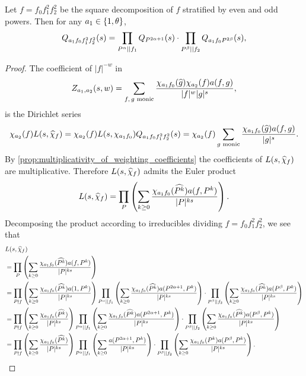 \documentclass[12pt,reqno,oneside]{amsart}
\begin{document}
    \begin{theorem}\label{thm:correction_polynomial_Euler_product}
        Let $f = f_{0}f_{1}^{2}f_{2}^{2}$ be the square decomposition of $f$ stratified by even and odd powers. Then for any $a_{1} \in \{1,\theta\}$,
        \[
            Q_{a_{1}f_{0}f_{1}^{2}f_{2}^{2}}(s) = \prod_{P^{\alpha} \mid\mid f_{1}}Q_{P^{2\alpha+1}}(s) \cdot \prod_{P^{\beta} \mid\mid f_{2}}Q_{a_{1}f_{0}P^{2\beta}}(s),
        \]
    \end{theorem}
    \begin{proof}
        The coefficient of $|f|^{-w}$ in
        \[
            Z_{a_{1},a_{2}}(s,w) = \sum_{\text{$f,g$ monic}}\frac{\chi_{a_{1}f_{0}}(\widehat{g})\chi_{a_{2}}(f)a(f,g)}{|f|^{w}|g|^{s}},
        \]
        is the Dirichlet series
        \[
            \chi_{a_{2}}(f)L(s,\widehat{\chi}_{f}) = \chi_{a_{2}}(f)L(s,\chi_{a_{1}f_{0}})Q_{a_{1}f_{0}f_{1}^{2}f_{2}^{2}}(s) = \chi_{a_{2}}(f)\sum_{\text{$g$ monic}}\frac{\chi_{a_{1}f_{0}}(\widehat{g})a(f,g)}{|g|^{s}}.
        \]
        By \cref{prop:multiplicativity_of_weighting_coefficients} the coefficients of $L(s,\widehat{\chi}_{f})$ are multiplicative. Therefore $L(s,\widehat{\chi}_{f})$ admits the Euler product
        \[
            L(s,\widehat{\chi}_{f}) = \prod_{P}\left(\sum_{k \ge 0}\frac{\chi_{a_{1}f_{0}}(\widehat{P^{k}})a(f,P^{k})}{|P|^{ks}}\right).
        \]
        Decomposing the product according to irreducibles dividing $f = f_{0}f_{1}^{2}f_{2}^{2}$, we see that
        \begin{align*}
            & L(s,\what{\chi}_{f}) \\
            &= \prod_{P}\left(\sum_{k \ge 0}\frac{\chi_{a_{1}f_{0}}(\what{P^{k}})a(f,P^{k})}{|P|^{ks}}\right) \\
            &= \prod_{P \nmid f}\left(\sum_{k \ge 0}\frac{\chi_{a_{1}f_{0}}(\what{P^{k}})a(1,P^{k})}{|P|^{ks}}\right)\prod_{P^{\a} \mid\mid f_{1}}\left(\sum_{k \ge 0}\frac{\chi_{a_{1}f_{0}}(\what{P^{k}})a(P^{2\a+1},P^{k})}{|P|^{ks}}\right) \cdot \prod_{P^{\b} \mid\mid f_{2}}\left(\sum_{k \ge 0}\frac{\chi_{a_{1}f_{0}}(\what{P^{k}})a(P^{\b},P^{k})}{|P|^{ks}}\right) \\
            &= \prod_{P \nmid f}\left(\sum_{k \ge 0}\frac{\chi_{a_{1}f_{0}}(\what{P^{k}})}{|P|^{ks}}\right)\prod_{P^{\a} \mid\mid f_{1}}\left(\sum_{k \ge 0}\frac{\chi_{a_{1}f_{0}}(\what{P^{k}})a(P^{2\a+1},P^{k})}{|P|^{ks}}\right) \cdot \prod_{P^{\b} \mid\mid f_{2}}\left(\sum_{k \ge 0}\frac{\chi_{a_{1}f_{0}}(\what{P^{k}})a(P^{\b},P^{k})}{|P|^{ks}}\right) \\
            &= \prod_{P \nmid f}\left(\sum_{k \ge 0}\frac{\chi_{a_{1}f_{0}}(\what{P^{k}})}{|P|^{ks}}\right)\prod_{P^{\a} \mid\mid f_{1}}\left(\sum_{k \ge 0}\frac{a(P^{2\a+1},P^{k})}{|P|^{ks}}\right) \cdot \prod_{P^{\b} \mid\mid f_{2}}\left(\sum_{k \ge 0}\frac{\chi_{a_{1}f_{0}}(P^{k})a(P^{\b},P^{k})}{|P|^{ks}}\right).

\end{align*}
\end{proof}
\end{document}

